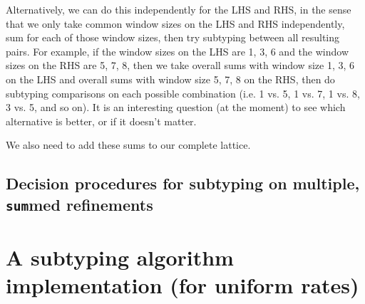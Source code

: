 \documentclass[acmsmall,nonacm,screen]{acmart}
\begin{document}
Alternatively, we can do this independently for the LHS and RHS, in the sense that we only take common window sizes on the LHS and RHS independently, sum for each of those window sizes, then try subtyping between all resulting pairs. For example, if the window sizes on the LHS are 1, 3, 6 and the window sizes on the RHS are 5, 7, 8, then we take overall sums with window size 1, 3, 6 on the LHS and overall sums with window size 5, 7, 8 on the RHS, then do subtyping comparisons on each possible combination (i.e. 1 vs. 5, 1 vs. 7, 1 vs. 8, 3 vs. 5, and so on). It is an interesting question (at the moment) to see which alternative is better, or if it doesn't matter.

We also need to add these sums to our complete lattice.
\subsection{Decision procedures for subtyping on multiple, \texttt{sum}med refinements}


\section{A subtyping algorithm implementation (for uniform rates)}
\end{document}
